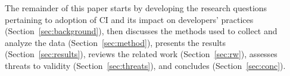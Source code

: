 The remainder of this paper starts by developing the research questions 
pertaining to adoption of CI and its impact on developers' practices 
(Section~\ref{sec:background}), then discusses the methods used to collect 
and analyze the data (Section~\ref{sec:method}), presents the results 
(Section~\ref{sec:results}), reviews the related work (Section~\ref{sec:rw}),
assesses threats to validity (Section~\ref{sec:threats}), and concludes 
(Section~\ref{sec:conc}).






